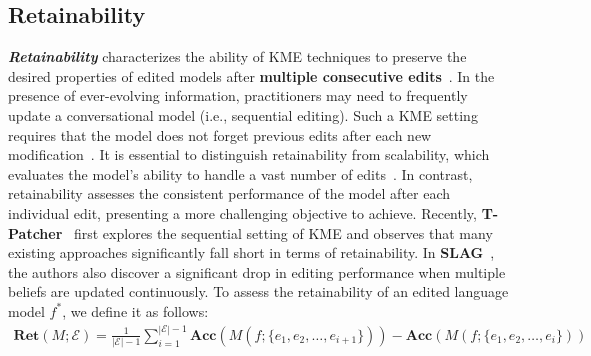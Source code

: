 \documentclass[acmsmall, screen]{acmart}
\begin{document}
\subsection{Retainability}

\textbf{\textit{Retainability}} characterizes the ability of KME techniques to preserve the desired properties of edited models after \textbf{multiple consecutive edits}~{\cite{jiang2024learning,yu2024melo,gu2023pokemqa}}. In the presence of ever-evolving information, practitioners may need to frequently update a conversational model (i.e., sequential editing). Such a KME setting requires that the model does not forget previous edits after each new modification~\cite{e1}. {It is essential to distinguish retainability from scalability}, which evaluates the model's ability to handle a vast number of edits~\cite{p4}. In contrast, retainability assesses the consistent performance of the model after each individual edit, presenting a more challenging objective to achieve. Recently, \textbf{T-Patcher}~\cite{Transformer-Patcher} first explores the sequential setting of KME and observes that many existing approaches significantly fall short in terms of retainability. In \textbf{SLAG}~\cite{hase2023methods}, the authors also discover a significant drop in editing performance when multiple beliefs are updated continuously. To assess the retainability of an edited language model $f^{*}$, we define it as follows:
\begin{equation}
\begin{aligned}
    \mathbf{Ret}(M;\mathcal{E})=\frac{1}{|\mathcal{E}|-1}\sum\limits_{i=1}^{|\mathcal{E}|-1}\mathbf{Acc}(M(f;\{e_1,e_2,\dotsc, e_{i+1}\})) - \mathbf{Acc}(M(f;\{e_1,e_2,\dotsc, e_{i}\}))    
\end{aligned}
\end{equation}
\end{document}
